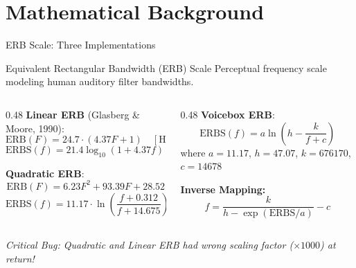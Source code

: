 \documentclass[aspectratio=169,20pt]{beamer}
\newcommand{\ERB}{\text{ERB}}
\begin{document}
\section{Mathematical Background}

\begin{frame}{ERB Scale: Three Implementations}
\begin{block}{Equivalent Rectangular Bandwidth (ERB) Scale}
Perceptual frequency scale modeling human auditory filter bandwidths.
\end{block}

\vspace{0.3cm}
\begin{columns}
\begin{column}{0.48\textwidth}
\textbf{Linear ERB} (Glasberg \& Moore, 1990):
\begin{equation*}
\ERB(F) = 24.7 \cdot (4.37F + 1) \quad [\text{Hz}]
\end{equation*}
\begin{equation*}
\text{ERBS}(f) = 21.4 \log_{10}(1 + 4.37f) \quad [\text{kHz}]
\end{equation*}

\vspace{0.2cm}
\textbf{Quadratic ERB}:
\begin{equation*}
\ERB(F) = 6.23F^2 + 93.39F + 28.52
\end{equation*}
\begin{equation*}
	\text{ERBS}(f) = 11.17 \cdot \ln\left(\frac{f+0.312}{f+14.675}\right) + 43.0
\end{equation*}
\end{column}

\begin{column}{0.48\textwidth}
\textbf{Voicebox ERB}:
\begin{equation*}
\text{ERBS}(f) = a\ln\left(h - \frac{k}{f+c}\right)
\end{equation*}
where $a = 11.17$, $h = 47.07$, $k = 676170$, $c = 14678$

\vspace{0.3cm}
\textbf{Inverse Mapping:}
\begin{equation*}
f = \frac{k}{h - \exp(\text{ERBS}/a)} - c
\end{equation*}
\end{column}
\end{columns}

\vspace{0.3cm}
\begin{center}
\textit{Critical Bug: Quadratic and Linear ERB had wrong scaling factor ($\times 1000$) at return!}
\end{center}
\end{frame}
\end{document}
